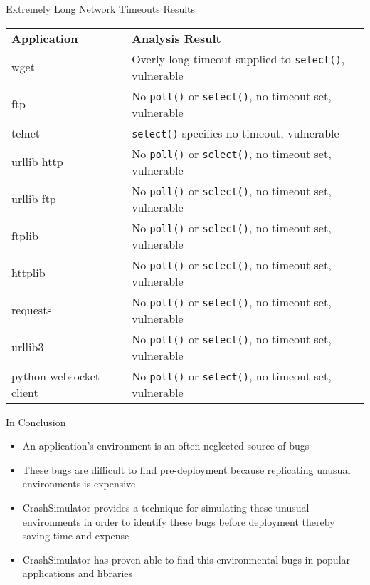 \documentclass[pdf]{beamer}
\begin{document}
\begin{frame}{Extremely Long Network Timeouts Results}
  \tiny{}
  \begin{tabular}{l | l}
    {\bf Application}              & {\bf Analysis Result}\\
    wget                     & Overly long timeout supplied to {\tt select()}, vulnerable\\
    ftp                      & No {\tt poll()} or {\tt select()}, no timeout set, vulnerable\\
    telnet                   & {\tt select()} specifies no timeout, vulnerable\\
    urllib http              & No {\tt poll()} or {\tt select()}, no timeout set, vulnerable\\
    urllib ftp               & No {\tt poll()} or {\tt select()}, no timeout set, vulnerable\\
    ftplib                   & No {\tt poll()} or {\tt select()}, no timeout set, vulnerable\\
    httplib                  & No {\tt poll()} or {\tt select()}, no timeout set, vulnerable\\
    requests                 & No {\tt poll()} or {\tt select()}, no timeout set, vulnerable\\
    urllib3                  & No {\tt poll()} or {\tt select()}, no timeout set, vulnerable\\
    python-websocket-client  & No {\tt poll()} or {\tt select()}, no timeout set, vulnerable\\
  \end{tabular}
\end{frame}


\begin{frame}{In Conclusion}
  \begin{itemize}
  \item{An application's environment is an often-neglected source of bugs}
  \item{These bugs are difficult to find pre-deployment because replicating
      unusual environments is expensive}
  \item{CrashSimulator provides a technique for simulating these unusual
      environments in order to identify these bugs before deployment thereby
      saving time and expense}
  \item{CrashSimulator has proven able to find this environmental bugs in
      popular applications and libraries}
  \end{itemize}
\end{frame}
     
\end{document}
